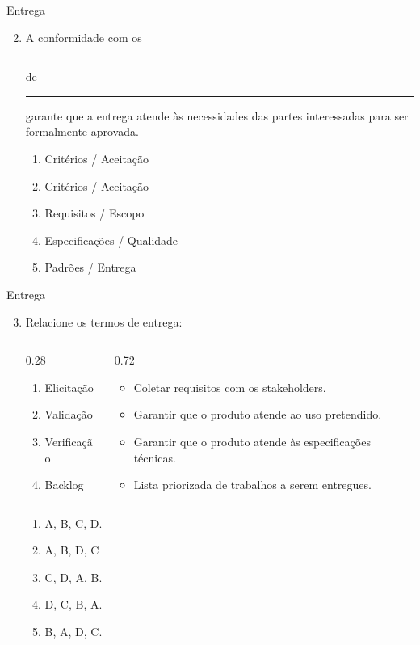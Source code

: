 \documentclass{beamer}
\begin{document}
\begin{frame}{Entrega}
	\begin{enumerate}
		\setcounter{enumi}{1}
		\justifying
		\item A conformidade com os \rule{50pt}{1pt} de \rule{50pt}{1pt} garante que a entrega atende às necessidades das partes interessadas para ser formalmente aprovada.
		\begin{enumerate}[a]
			\item Critérios / Aceitação
			\item \alert<2>{Critérios / Aceitação}
			\item Requisitos / Escopo
			\item Especificações / Qualidade
			\item Padrões / Entrega
		\end{enumerate}
	\end{enumerate}
\end{frame}

\begin{frame}{Entrega}
	\begin{enumerate}
		\setcounter{enumi}{2}
		\justifying
		\item Relacione os termos de entrega:
		\begin{columns}
			\begin{column}{0.28\textwidth}
				\begin{enumerate}[A]
					\item Elicitação
					\item Validação
					\item Verificação
					\item Backlog
				\end{enumerate}
			\end{column}
			\begin{column}{0.72\textwidth}
				\begin{itemize}
					\item Coletar requisitos com os stakeholders.
					\item Garantir que o produto atende ao uso pretendido.
					\item Garantir que o produto atende às especificações técnicas.
					\item Lista priorizada de trabalhos a serem entregues.
				\end{itemize}
			\end{column}
		\end{columns}
		\begin{enumerate}[a]
			\item A, B, C, D.
			\item \alert<2>{A, B, D, C}
			\item C, D, A, B.
			\item D, C, B, A.
			\item B, A, D, C.
		\end{enumerate}
	\end{enumerate}
\end{frame}
\end{document}
